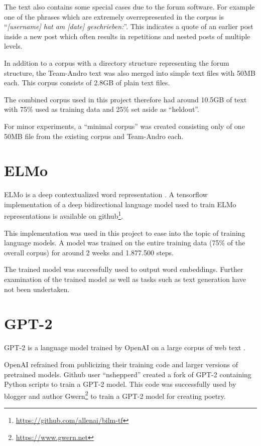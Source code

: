 \documentclass{scrartcl}
\begin{document}
The text also contains some special cases due to the forum software.
For example one of the phrases which are extremely overrepresented in the corpus is \enquote{\textit{[username] hat am [date] geschrieben:}}.
This indicates a quote of an earlier post inside a new post which often results in repetitions and nested posts of multiple levels.

In addition to a corpus with a directory structure representing the forum structure, the Team-Andro text was also merged into simple text files with 50MB each. This corpus consists of 2.8GB of plain text files.

The combined corpus used in this project therefore had around 10.5GB of text with 75\% used as training data and 25\% set aside as \enquote{heldout}.

For minor experiments, a \enquote{minimal corpus} was created consisting only of one 50MB file from the existing corpus and Team-Andro each.



\section{ELMo}

ELMo is a deep contextualized word representation \cite{Peters:2018}. A tensorflow implementation of a deep bidirectional language model used to train ELMo representations is available on github\footnote{\url{https://github.com/allenai/bilm-tf}}.

This implementation was used in this project to ease into the topic of training language models. A model was trained on the entire training data (75\% of the overall corpus) for around 2 weeks and 1.877.500 steps.

The trained model was successfully used to output word embeddings. Further examination of the trained model as well as tasks such as text generation have not been undertaken.


\section{GPT-2}
GPT-2 is a language model trained by OpenAI on a large corpus of web text \cite{radford2019language}.

OpenAI refrained from publicizing their training code and larger versions of pretrained models.
Github user \enquote{nshepperd} created a fork of GPT-2 containing Python scripts to train a GPT-2 model. This code was successfully used by blogger and author Gwern\footnote{\url{https://www.gwern.net}} to train a GPT-2 model for creating poetry.
\end{document}
